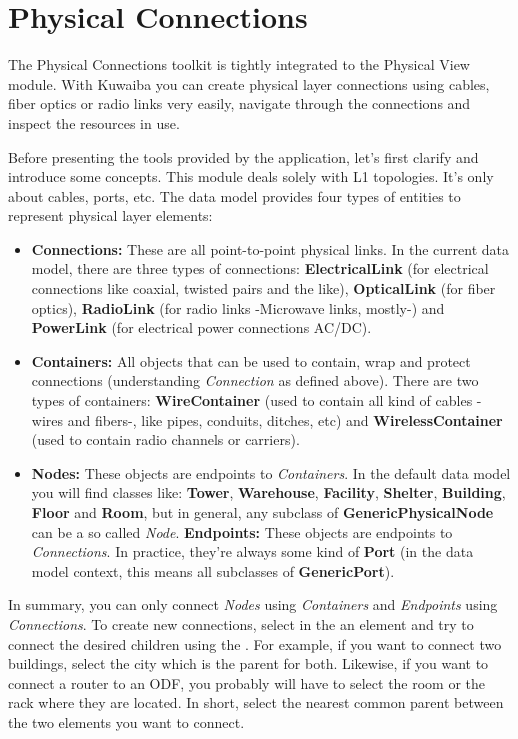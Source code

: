 \documentclass[a4paper]{article}
\begin{document}
	\newpage
	\section{Physical Connections} \label{sec:physical_connections}
		The Physical Connections toolkit is tightly integrated to the Physical View module. With Kuwaiba you can create physical layer connections using cables, fiber optics or radio links very easily, navigate through the connections and inspect the resources in use.\newline
		
		Before presenting the tools provided by the application, let's first clarify and introduce some concepts. This module deals solely with L1 topologies. It's only about cables, ports, etc. The data model provides four types of entities to represent physical layer elements:
		\begin{itemize}
			\item \textbf{Connections:} These are all point-to-point physical links. In the current data model, there are three	types of connections: \textbf{ElectricalLink} (for electrical connections like coaxial, twisted
			pairs and the like), \textbf{OpticalLink} (for fiber optics), \textbf{RadioLink} (for radio links -Microwave links, mostly-) and \textbf{PowerLink} (for electrical power connections AC/DC).
			\item \textbf{Containers:} All objects that can be used to contain, wrap and protect connections (understanding \textit{Connection} as defined above). There are two types of containers: \textbf{WireContainer} (used to contain all kind of cables -wires and fibers-, like pipes, conduits, ditches, etc) and \textbf{WirelessContainer} (used to contain radio channels or carriers).
			\item \textbf{Nodes:} These objects are endpoints to \textit{Containers}. In the default data model you will find classes like: \textbf{Tower}, \textbf{Warehouse}, \textbf{Facility}, \textbf{Shelter}, \textbf{Building}, \textbf{Floor} and \textbf{Room}, but in general, any subclass of \textbf{GenericPhysicalNode} can be a so called \textit{Node}.
			\textbf{Endpoints:} These objects are endpoints to \textit{Connections}. In practice, they're always some kind of \textbf{Port} (in the data model context, this means all subclasses of \textbf{GenericPort}).
		\end{itemize}
		In summary, you can only connect \textit{Nodes} using \textit{Containers} and \textit{Endpoints} using \textit{Connections}. To create new connections, select in the \textbf{} an element and try to connect the desired children using the . For example, if you want to connect two buildings, select the city which is the parent for both. Likewise, if you want to connect a router to an ODF, you probably will have to select the room or the rack where they are located. In short, select the nearest common parent between the two elements you want to connect.
		
\end{document}

